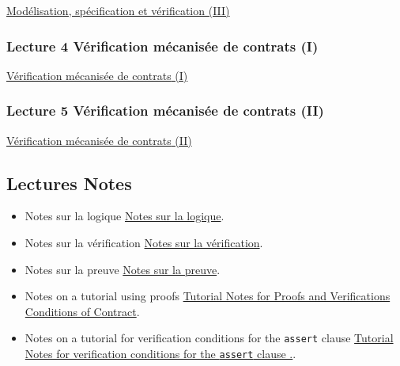 \documentclass[ 12pt]{article}
\begin{document}
  \href{http://mery54.github.io/teaching/movex/lecturesnotes/movexlecture3.pdf}{Mod\'elisation,     sp\'ecification et v\'erification (III)}


  
  \subsubsection{Lecture 4 {Vérification  mécanisée de contrats} (I)}
  
\href{http://mery54.github.io/teaching/movex/lecturesnotes/movexlecture4.pdf}{{Vérification  mécanisée de contrats} (I)}



  \subsubsection{Lecture 5 {Vérification  mécanisée de contrats} (II)}
  
\href{http://mery54.github.io/teaching/movex/lecturesnotes/movexlecture5.pdf}{{Vérification  mécanisée de contrats} (II)}



  

  \subsection{Lectures Notes}

  \begin{itemize}
  \item[]   Notes sur la logique
    \href{http://mery54.github.io/teaching/movex/lecturesnotes/preprint-chapterlogique.pdf}{Notes sur la logique}.

     \item[]   Notes sur la vérification
    \href{http://mery54.github.io/teaching/movex/lecturesnotes/preprint-chapterverification.pdf}{Notes
      sur la vérification}.

     \item[]   Notes sur la preuve
    \href{http://mery54.github.io/teaching/movex/lecturesnotes/preprint-chapterprouver.pdf}{Notes
      sur la preuve}.

    \item[]  Notes on a tutorial using proofs 
    \href{http://mery54.github.io/teaching/movex/lecturesnotes/notestuto3.pdf}{Tutorial 
      Notes for Proofs and Verifications Conditions of Contract}. 


    \item[]  Notes on a tutorial    for verification  conditions for the 
  \texttt{assert} clause 
    \href{http://mery54.github.io/teaching/movex/lecturesnotes/notestuto4.pdf}{Tutorial 
      Notes for   verification  conditions for the \texttt{assert} clause .}. 


    
  \end{itemize}
\end{document}
